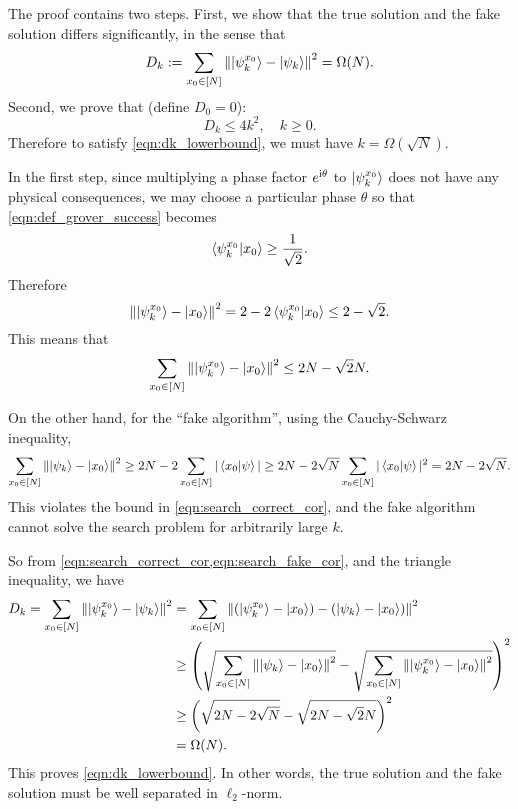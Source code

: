 The proof contains two steps. First, we show that the true solution and the fake solution differs significantly, in the sense that 
\begin{equation}\label{eqn:dk_lowerbound}
D_k:=\sum_{x_0\in[N]}\left\lVert\ket{\psi^{x_0}_k}-\ket{\psi_k}\right\rVert^2=\Omega(N).
\end{equation}
Second, we prove that (define $D_0=0$):
\begin{equation}
D_k\le 4k^2, \quad k\ge 0.
\label{eqn:grover_dk}
\end{equation}
Therefore to satisfy \cref{eqn:dk_lowerbound}, we must have $k=\Omega(\sqrt{N})$.

In the first step, since multiplying a phase factor $e^{\mathrm{i} \theta}$ to $\ket{\psi^{x_0}_k}$ does not have any physical consequences, we may choose a particular phase $\theta$ so that \cref{eqn:def_grover_success} becomes
\begin{equation}
\braket{\psi^{x_0}_k|x_0}\ge \frac{1}{\sqrt{2}}.
\end{equation}
Therefore
\begin{equation}
\left\lVert\ket{\psi^{x_0}_k}-\ket{x_0}\right\rVert^2= 2-2\braket{\psi^{x_0}_k|x_0}\le 2-\sqrt{2}.
\end{equation}
This means that
\begin{equation}
\sum_{x_0\in[N]}\left\lVert\ket{\psi^{x_0}_k}-\ket{x_0}\right\rVert^2\le 2N-\sqrt{2}N.
\label{eqn:search_correct_cor}
\end{equation}

On the other hand, for the ``fake algorithm'', using the Cauchy-Schwarz inequality,
\begin{equation}
\sum_{x_0\in[N]}\left\lVert\ket{\psi_k}-\ket{x_0}\right\rVert^2\ge 2N-2\sum_{x_0\in[N]}|\braket{x_0|\psi}|\ge2N-2\sqrt{N} \sum_{x_0\in[N]}|\braket{x_0|\psi}|^2=2N-2\sqrt{N}.
\label{eqn:search_fake_cor}
\end{equation}
This violates the bound in \cref{eqn:search_correct_cor}, and the fake algorithm cannot solve the search problem for arbitrarily large $k$.

So from \cref{eqn:search_correct_cor,eqn:search_fake_cor}, and the triangle inequality, we have
\begin{equation}
\begin{split}
D_k=\sum_{x_0\in[N]}\left\lVert\ket{\psi^{x_0}_k}-\ket{\psi_k}\right\rVert^2&=\sum_{x_0\in[N]}\left\lVert(\ket{\psi^{x_0}_k}-\ket{x_0})-(\ket{\psi_k}-\ket{x_0})\right\rVert^2\\
&\ge \left(\sqrt{\sum_{x_0\in[N]}\left\lVert\ket{\psi_k}-\ket{x_0}\right\rVert^2}-\sqrt{\sum_{x_0\in[N]}\left\lVert\ket{\psi^{x_0}_k}-\ket{x_0}\right\rVert^2}\right)^2\\
&\ge \left(\sqrt{2N-2\sqrt{N}}-\sqrt{2N-\sqrt{2}N}\right)^2\\
&=\Omega(N). 
\end{split}
\end{equation}
This proves \cref{eqn:dk_lowerbound}.
In other words, the true solution and the fake solution must be well separated in $\ell_2$-norm.


